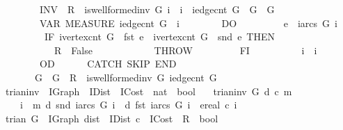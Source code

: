 \begin{isabellebody}
\ \ \ \ \ \ \ \ INV\ {\isasymlbrace}\ {\isasymacute}R\ {\isacharequal}\ is{\isacharunderscore}wellformed{\isacharunderscore}inv\ {\isasymacute}G\ {\isasymacute}i\ {\isasymand}\ {\isasymacute}i\ {\isasymle}\ iedge{\isacharunderscore}cnt\ {\isasymacute}G\ {\isasymand}\ {\isasymacute}G\ {\isacharequal}\ G\ {\isasymrbrace}\isanewline
\ \ \ \ \ \ \ \ VAR\ MEASURE\ {\isacharparenleft}iedge{\isacharunderscore}cnt\ {\isasymacute}G\ {\isacharminus}\ {\isasymacute}i{\isacharparenright}\isanewline
\ \ \ \ \ \ \ \ DO\isanewline
\ \ \ \ \ \ \ \ \ {\isasymacute}e\ {\isacharcolon}{\isacharequal}{\isacharequal}\ iarcs\ {\isasymacute}G\ {\isasymacute}i\ {\isacharsemicolon}{\isacharsemicolon}\isanewline
\ \ \ \ \ \ \ \ \ IF\ ivertex{\isacharunderscore}cnt\ {\isasymacute}G\ {\isasymle}\ fst\ {\isasymacute}e\ {\isasymor}\ ivertex{\isacharunderscore}cnt\ {\isasymacute}G\ {\isasymle}\ snd\ {\isasymacute}e\ THEN\isanewline
\ \ \ \ \ \ \ \ \ \ \ {\isasymacute}R\ {\isacharcolon}{\isacharequal}{\isacharequal}\ False\ {\isacharsemicolon}{\isacharsemicolon}\isanewline
\ \ \ \ \ \ \ \ \ \ \ THROW\isanewline
\ \ \ \ \ \ \ \ \ FI\ {\isacharsemicolon}{\isacharsemicolon}\isanewline
\ \ \ \ \ \ \ \ \ {\isasymacute}i\ {\isacharcolon}{\isacharequal}{\isacharequal}\ {\isasymacute}i\ {\isacharplus}\ {}\isanewline
\ \ \ \ \ \ \ \ OD\isanewline
\ \ \ \ \ \ CATCH\ SKIP\ END\isanewline
\ \ \ \ \ \ {\isasymlbrace}\ {\isasymacute}G\ {\isacharequal}\ G\ {\isasymand}\ {\isasymacute}R\ {\isacharequal}\ is{\isacharunderscore}wellformed{\isacharunderscore}inv\ {\isasymacute}G\ {\isacharparenleft}iedge{\isacharunderscore}cnt\ {\isasymacute}G{\isacharparenright}\ {\isasymrbrace}\isanewline
\ \ \ \ {\isachardoublequoteclose}\isanewline
\isanewline
{}\isamarkupfalse%
\ trian{\isacharunderscore}inv\ {\isacharcolon}{\isacharcolon}\ {\isachardoublequoteopen}IGraph\ {\isasymRightarrow}\ IDist\ {\isasymRightarrow}\ ICost\ {\isasymRightarrow}\ nat\ {\isasymRightarrow}\ bool{\isachardoublequoteclose}\ \isanewline
\ \ {\isachardoublequoteopen}trian{\isacharunderscore}inv\ G\ d\ c\ m\ {\isasymequiv}\ \isanewline
\ \ \ \ {\isasymforall}i\ {\isacharless}\ m{\isachardot}\ d\ {\isacharparenleft}snd\ {\isacharparenleft}iarcs\ G\ i{\isacharparenright}{\isacharparenright}\ {\isasymle}\ d\ {\isacharparenleft}fst\ {\isacharparenleft}iarcs\ G\ i{\isacharparenright}{\isacharparenright}\ {\isacharplus}\ ereal\ {\isacharparenleft}c\ i{\isacharparenright}{\isachardoublequoteclose}\isanewline
\isanewline
{}\isamarkupfalse%
\ trian\ {\isacharparenleft}G\ {\isacharcolon}{\isacharcolon}\ IGraph{\isacharcomma}\ dist\ {\isacharcolon}{\isacharcolon}\ IDist{\isacharcomma}\ c\ {\isacharcolon}{\isacharcolon}\ ICost\ {\isacharbar}\ R\ {\isacharcolon}{\isacharcolon}\ bool{\isacharparenright}\isanewline

\end{isabellebody}
